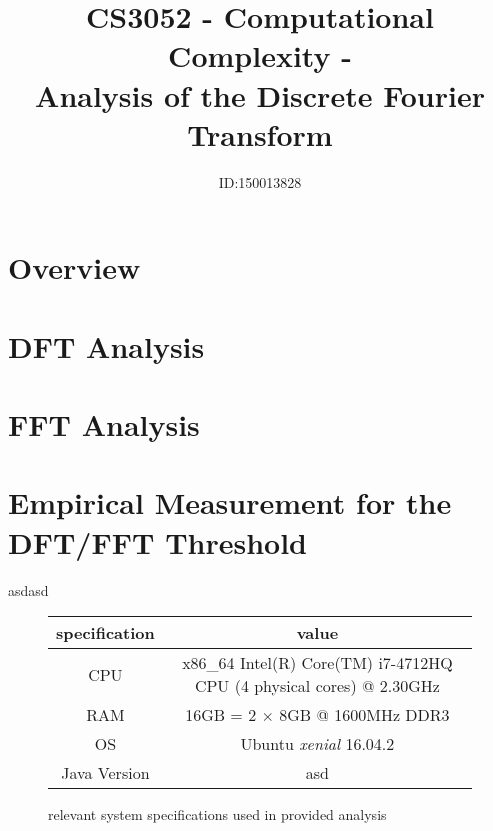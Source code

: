 \documentclass[]{article}
\title{CS3052 - Computational Complexity -\\Analysis of the Discrete Fourier Transform}
\author{ID:150013828}
\begin{document}
\maketitle

\section{Overview}
\section{DFT Analysis}
\section{FFT Analysis}
\section{Empirical Measurement for the DFT/FFT Threshold}
asdasd
\begin{figure}[h]
	\begin{center}
		\begin{tabular}{ | c | c | }
			\hline
			specification & value \\
			\hline
			CPU & x86\_64 Intel(R) Core(TM) i7-4712HQ CPU (4 physical cores) @ 2.30GHz \\
			\hline
			RAM & 16GB = 2 $\times$ 8GB @ 1600MHz DDR3\\ 
			\hline
			OS & Ubuntu \emph{xenial} 16.04.2 \\
			\hline
			Java Version & asd \\
			\hline
		\end{tabular}
	\end{center}
	\caption{relevant system specifications used in provided analysis\label{fig:specs}}
\end{figure}
\end{document}
